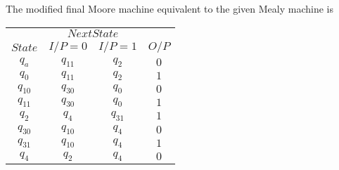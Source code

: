 \documentclass[8pt]{beamer}
\begin{document}
\begin{frame}
\hspace*{0.5cm} The modified final Moore machine equivalent to the given Mealy machine is\\

  \begin{center}
\begin{tabular}{cccc}
 \hline

 \hline

 \hline

 \hline
 & \multicolumn{2}{c}{$Next State$ }\\
 \cline{2-3}
 $State$ &  $I/P=0$ & $I/P=1$  &  $O/P$\\
\hline
$q_a$    &    $q_11$   &  $q_2$    &  $0$ \\
$q_0$    &    $q_11$   &  $q_2$    &  $1$ \\
$q_10$   &    $q_30$   &  $q_0$    &  $0$ \\
$q_11$   &    $q_30$   &  $q_0$    &  $1$ \\
$q_2$    &    $q_4$    &  $q_31$   &  $1$ \\
$q_30$   &    $q_10$   &  $q_4$    &  $0$ \\
$q_31$   &    $q_10$   &  $q_4$    &  $1$ \\
$q_4$    &    $q_2$    &  $q_4$    &  $0$ \\
 \hline

 \hline

 \hline

 \hline
\end{tabular}
\end{center}

\vspace*{0.3cm}
\end{frame}
\end{document}
